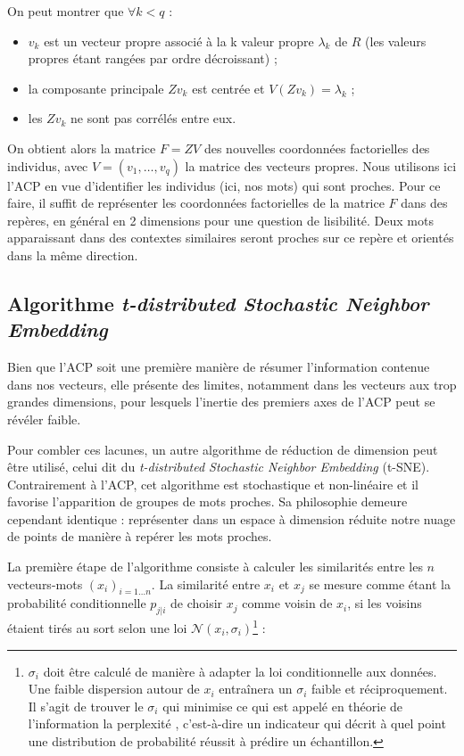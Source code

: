 \documentclass[11pt,french,french]{article}
\providecommand{\tightlist}{%
  \setlength{\parskip}{0pt}
  }
\let\rmarkdownfootnote\footnote%
\def\footnote{\protect\rmarkdownfootnote}
\begin{document}
On peut montrer que \(\forall k < q\) :

\begin{itemize}
\tightlist
\item
  \(v_k\) est un vecteur propre associé à la k\ieme{} valeur propre \(\lambda_k\) de \(R\) (les valeurs propres étant rangées par ordre décroissant) ;
\item
  la composante principale \(Zv_k\) est centrée et \(V(Zv_k)= \lambda_k\) ;
\item
  les \(Zv_k\) ne sont pas corrélés entre eux.
\end{itemize}

On obtient alors la matrice \(F = ZV\) des nouvelles coordonnées factorielles des individus, avec \(V = (v_1,\dots,v_q)\) la matrice des vecteurs propres.
Nous utilisons ici l'ACP en vue d'identifier les individus (ici, nos mots) qui sont proches. Pour ce faire, il suffit de représenter les coordonnées factorielles de la matrice \(F\) dans des repères, en général en 2 dimensions pour une question de lisibilité. Deux mots apparaissant dans des contextes similaires seront proches sur ce repère et orientés dans la même direction.

\hypertarget{algorithme-t-distributed-stochastic-neighbor-embedding}{%
\subsection{\texorpdfstring{Algorithme \emph{t-distributed Stochastic Neighbor Embedding}}{Algorithme t-distributed Stochastic Neighbor Embedding}}\label{algorithme-t-distributed-stochastic-neighbor-embedding}}

Bien que l'ACP soit une première manière de résumer l'information contenue dans nos vecteurs, elle présente des limites, notamment dans les vecteurs aux trop grandes dimensions, pour lesquels l'inertie des premiers axes de l'ACP peut se révéler faible.

Pour combler ces lacunes, un autre algorithme de réduction de dimension peut être utilisé, celui dit du \emph{t-distributed Stochastic Neighbor Embedding} (t-SNE).
Contrairement à l'ACP, cet algorithme est stochastique et non-linéaire et il favorise l'apparition de groupes de mots proches.
Sa philosophie demeure cependant identique : représenter dans un espace à dimension réduite notre nuage de points de manière à repérer les mots proches.

La première étape de l'algorithme consiste à calculer les similarités entre les \(n\) vecteurs-mots \((x_i)_{i=1...n}\). La similarité entre \(x_i\) et \(x_j\) se mesure comme étant la probabilité conditionnelle \(p_{j|i}\) de choisir \(x_j\) comme voisin de \(x_i\), si les voisins étaient tirés au sort selon une loi \(\mathcal{N}(x_i, \sigma_i)\)\footnote{\(\sigma_i\) doit être calculé de manière à adapter la loi conditionnelle aux données.
  Une faible dispersion autour de \(x_i\) entraînera un \(\sigma_i\) faible et réciproquement.
  Il s'agit de trouver le \(\sigma_i\) qui minimise ce qui est appelé en théorie de l'information la \og perplexité \fg{}, c'est-à-dire un indicateur qui décrit à quel point une distribution de probabilité réussit à prédire un échantillon.} :
\end{document}
